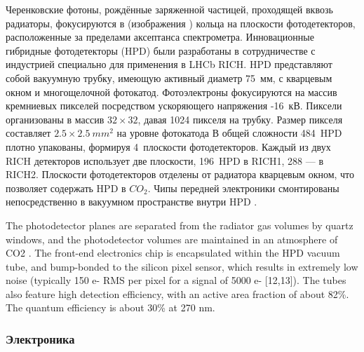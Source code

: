 Черенковские фотоны, рождённые заряженной частицей, проходящей вквозь радиаторы, фокусируются в (изображения \todo) кольца на плоскости фотодетекторов, расположенные за пределами аксептанса спектрометра. Инновационные гибридные фотодетекторы (HPD) были разработаны в сотрудничестве с индустрией специально для применения в LHCb RICH. HPD представляют собой вакуумную трубку, имеющую активный диаметр 75~мм, с кварцевым окном и многощелочной фотокатод. Фотоэлектроны фокусируются на массив кремниевых пикселей посредством ускоряющего напряжения -16~кВ. Пиксели организованы в массив $32 \times 32$, давая 1024 пикселя на трубку. Размер пикселя составляет $2.5 \times 2.5~mm^{2}$ на уровне фотокатода \todo В общей сложности 484~HPD плотно упакованы, формируя 4~плоскости фотодетекторов. Каждый из двух RICH детекторов использует две плоскости, 196~HPD в RICH1, 288 --- в RICH2.
Плоскости фотодетекторов отделены от радиатора кварцевым окном, что позволяет содержать HPD в $CO_{2}$. Чипы передней электроники смонтированы непосредственно в вакуумном пространстве внутри HPD \todo.

The photodetector planes are separated from the radiator gas volumes by quartz windows, and the photodetector volumes are maintained in an atmosphere of CO2 . The front-end electronics chip is encapsulated within the HPD vacuum tube, and bump-bonded to the silicon pixel sensor, which results in extremely low noise (typically 150 e- RMS per pixel for a signal of 5000 e- [12,13]). The tubes also feature high detection efficiency, with an active area fraction of about 82\%. The quantum efficiency is about 30\% at 270 nm.

\subsubsection{Электроника}


